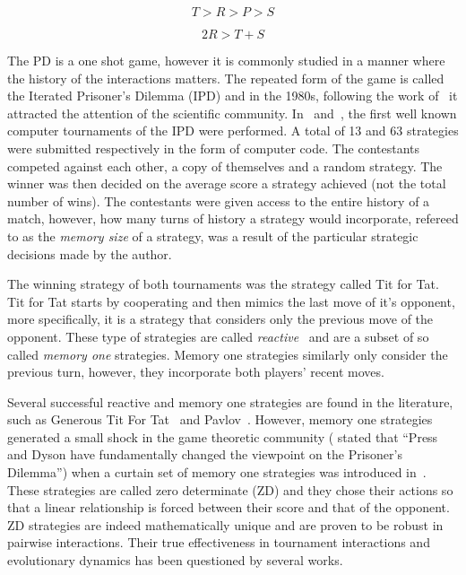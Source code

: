 \documentclass[10pt]{article}
\begin{document}
\begin{equation}\label{eq:pd_constrain_one}
    T > R > P > S
\end{equation}

\begin{equation}\label{eq:pd_constrain_two}
    2R > T + S
\end{equation}

The PD is a one shot game, however it is commonly studied in a manner where the
history of the interactions matters. The repeated form of the game is called the
Iterated Prisoner's Dilemma (IPD) and in the 1980s, following the work
of~\cite{Axelrod1980a, Axelrod1980b} it attracted the attention of the
scientific community. In~\cite{Axelrod1980a} and~\cite{Axelrod1980b}, the first
well known computer tournaments of the IPD were performed. A total of 13 and 63
strategies were submitted respectively in the form of computer code. The
contestants competed against each other, a copy of themselves and a random
strategy. The winner was then decided on the average score a strategy achieved (not
the total number of wins). The contestants were given access to the entire
history of a match, however, how many turns of history a strategy would
incorporate, refereed to as the \textit{memory size} of a strategy, was a result
of the particular strategic decisions made by the author.

The winning strategy of both tournaments was the strategy called Tit for Tat.
Tit for Tat starts by cooperating and then mimics the last move of it's
opponent, more specifically, it is a strategy that considers only the previous
move of the opponent. These type of strategies are called
\textit{reactive}~\cite{Nowak1989} and are a subset of so called \textit{memory
one} strategies. Memory one strategies similarly only consider the previous
turn, however, they incorporate both players' recent moves.

Several successful reactive and memory one strategies are found in the
literature, such as Generous Tit For Tat~\cite{Nowak1990} and
Pavlov~\cite{Nowak1993}. However, memory one strategies generated a small shock
in the game theoretic community (\cite{Stewart2012} stated that ``Press and
Dyson have fundamentally changed the viewpoint on the Prisoner's Dilemma'') when
a curtain set of memory one strategies was introduced in~\cite{Press2012}. These
strategies are called zero determinate (ZD) and they chose their actions so that
a linear relationship is forced between their score and that of the opponent. ZD
strategies are indeed mathematically unique and are proven to be robust in pairwise
interactions. Their true effectiveness in tournament interactions and evolutionary
dynamics has been questioned by several works.
\end{document}
